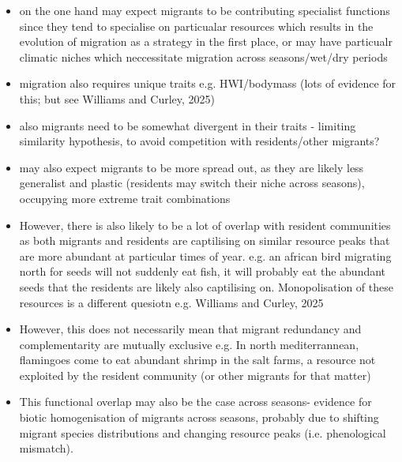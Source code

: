 \documentclass[11pt]{report}
\begin{document}

 \begin{itemize}
 \item on the one hand may expect migrants to be contributing specialist functions since they tend to specialise on particualar resources which results in the evolution of migration as a strategy in the first place, or may have particualr climatic niches which neccessitate migration across seasons/wet/dry periods
 \item migration also requires unique traits e.g. HWI/bodymass (lots of evidence for this; but see Williams and Curley, 2025)
 \item also migrants need to be somewhat divergent in their traits - limiting similarity hypothesis, to avoid competition with residents/other migrants?
 \item may also expect migrants to be more spread out, as they are likely less generalist and plastic (residents may switch their niche across seasons), occupying more extreme trait combinations
 \end{itemize}


\begin{itemize}
\item However, there is also likely to be a lot of overlap with resident communities as both migrants and residents are captilising on similar resource peaks that are more abundant at particular times of year. e.g. an african bird migrating north for seeds will not suddenly eat fish, it will probably eat the abundant seeds that the residents are likely also captilising on. Monopolisation of these resources is a different quesiotn e.g. Williams and Curley, 2025
\item However, this does not necessarily mean that migrant redundancy and complementarity are mutually exclusive e.g. In north mediterrannean, flamingoes come to eat abundant shrimp in the salt farms, a resource not exploited by the resident community (or other migrants for that matter)
\item This functional overlap may also be the case across seasons- evidence for biotic homogenisation of migrants across seasons, probably due to shifting migrant species distributions and changing resource peaks (i.e. phenological mismatch).
\end{itemize}
\end{document}
